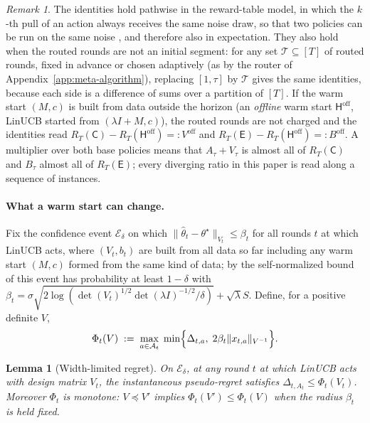 \documentclass{article}
\newtheorem{lemma}{Lemma}
\theoremstyle{definition}
\theoremstyle{remark}
\newtheorem{remark}{Remark}
\theoremstyle{remark}
\newcommand{\Cold}{\mathsf{C}}
\newcommand{\Exp}{\mathsf{E}}
\newcommand{\Hyb}{\mathsf{H}}
\begin{document}
\begin{remark}
\label{rem:decomp}
The identities hold pathwise in the reward-table model, in which the $k$-th
pull of an action always receives the same noise draw, so that two policies
can be run on the same noise \cite[\S4.6]{lattimore2020bandit}, and
therefore also in expectation. They also hold when the routed rounds are not
an initial segment: for any set $\mathcal T\subseteq[T]$ of routed rounds,
fixed in advance or chosen adaptively (as by the router of
Appendix~\ref{app:meta-algorithm}), replacing $[1,\tau]$ by $\mathcal T$
gives the same identities, because each side is a difference of sums over a
partition of $[T]$. If the warm start $(M,c)$ is built from data outside the
horizon (an \emph{offline} warm start $\Hyb^{\mathrm{off}}$, LinUCB started
from $(\lambda I+M,c)$), the routed rounds are not charged and the identities
read $R_T(\Cold)-R_T(\Hyb^{\mathrm{off}})=:V^{\mathrm{off}}$ and
$R_T(\Exp)-R_T(\Hyb^{\mathrm{off}})=:B^{\mathrm{off}}$. A multiplier over both
base policies means that $A_\tau+V_\tau$ is almost all of $R_T(\Cold)$ and
$B_\tau$ almost all of $R_T(\Exp)$; every diverging ratio in this paper is
read along a sequence of instances.
\end{remark}

\paragraph{What a warm start can change.}
\label{sec:width}
Fix the confidence event $\mathcal E_\delta$ on which
$\|\widehat\theta_t-\theta^\star\|_{V_t}\le\beta_t$ for all rounds $t$ at
which LinUCB acts, where $(V_t,b_t)$ are built from all data so far including
any warm start $(M,c)$ formed from the same kind of data; by the
self-normalized bound of \cite{abbasi2011improved} this event has probability
at least $1-\delta$ with
$\beta_t=\sigma\sqrt{2\log(\det(V_t)^{1/2}\det(\lambda I)^{-1/2}/\delta)}+\sqrt\lambda S$.
Define, for a positive definite $V$,
\begin{equation}
\label{eq:phi}
\Phi_t(V)\;:=\;\max_{a\in\mathcal A_t}\;\min\Bigl\{\Delta_{t,a},\;2\beta_t\|x_{t,a}\|_{V^{-1}}\Bigr\}.
\end{equation}

\begin{lemma}[Width-limited regret]
\label{lem:width-limited}
On $\mathcal E_\delta$, at any round $t$ at which LinUCB acts with design
matrix $V_t$, the instantaneous pseudo-regret satisfies
$\Delta_{t,A_t}\le\Phi_t(V_t)$. Moreover $\Phi_t$ is monotone: $V\preceq V'$
implies $\Phi_t(V')\le\Phi_t(V)$ when the radius $\beta_t$ is held fixed.
\end{lemma}
\end{document}
